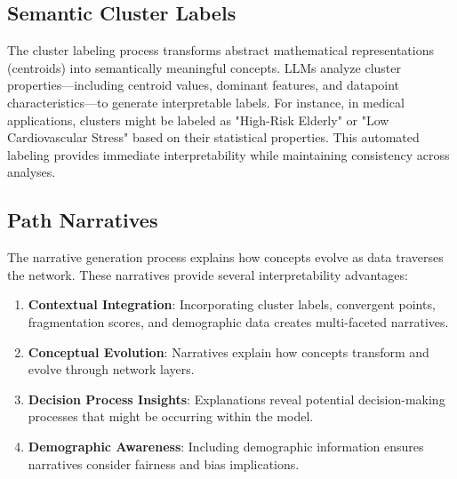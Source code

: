 \subsection{Semantic Cluster Labels}

The cluster labeling process transforms abstract mathematical representations (centroids) into semantically meaningful concepts. LLMs analyze cluster properties—including centroid values, dominant features, and datapoint characteristics—to generate interpretable labels. For instance, in medical applications, clusters might be labeled as "High-Risk Elderly" or "Low Cardiovascular Stress" based on their statistical properties. This automated labeling provides immediate interpretability while maintaining consistency across analyses.

\subsection{Path Narratives}

The narrative generation process explains how concepts evolve as data traverses the network. These narratives provide several interpretability advantages:

\begin{enumerate}
    \item \textbf{Contextual Integration}: Incorporating cluster labels, convergent points, fragmentation scores, and demographic data creates multi-faceted narratives.
    \item \textbf{Conceptual Evolution}: Narratives explain how concepts transform and evolve through network layers.
    \item \textbf{Decision Process Insights}: Explanations reveal potential decision-making processes that might be occurring within the model.
    \item \textbf{Demographic Awareness}: Including demographic information ensures narratives consider fairness and bias implications.
\end{enumerate}

%  
% 

